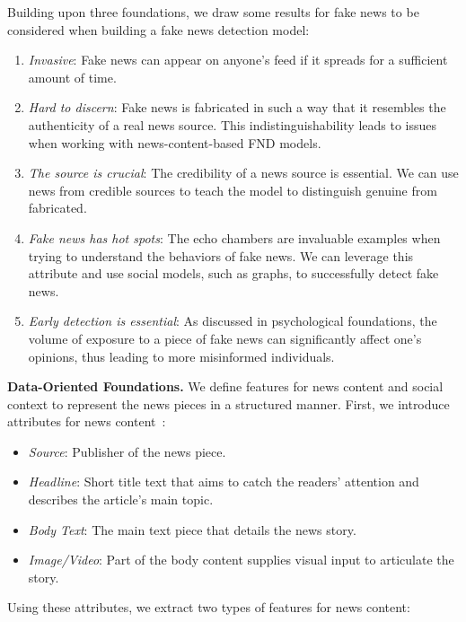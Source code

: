 Building upon three foundations, we draw some results for fake news to be considered when building a fake news detection model:
\begin{enumerate}
    \item \emph{Invasive}: Fake news can appear on anyone’s feed if it spreads for a sufficient amount of time.
    \item \emph{Hard to discern}: Fake news is fabricated in such a way that it resembles the authenticity of a real news source. This
          indistinguishability leads to issues when working with news-content-based FND models.
    \item \emph{The source is crucial}: The credibility of a news source is essential. We can use news from credible sources to teach the model
          to distinguish genuine from fabricated.
    \item \emph{Fake news has hot spots}: The echo chambers are invaluable examples when trying to understand the behaviors of fake news. We can
          leverage this attribute and use social models, such as graphs, to successfully detect fake news.
    \item \emph{Early detection is essential}: As discussed in psychological foundations, the volume of exposure to a piece of fake news can significantly affect one’s opinions, thus leading to more misinformed individuals.
\end{enumerate}
\textbf{Data-Oriented Foundations.} We define features for news content and social context to represent the news pieces in a structured manner. First, we introduce attributes for news content~\parencite{FakeNewsDetectionOnSocialMediaADataMiningPerspective_Shu}:
\begin{itemize}
    \item \emph{Source}: Publisher of the news piece.
    \item \emph{Headline}: Short title text that aims to catch the readers’ attention and describes the article's main topic.
    \item \emph{Body Text}: The main text piece that details the news story.
    \item \emph{Image/Video}: Part of the body content supplies visual input to articulate the story.
\end{itemize}
Using these attributes, we extract two types of features for news content:
